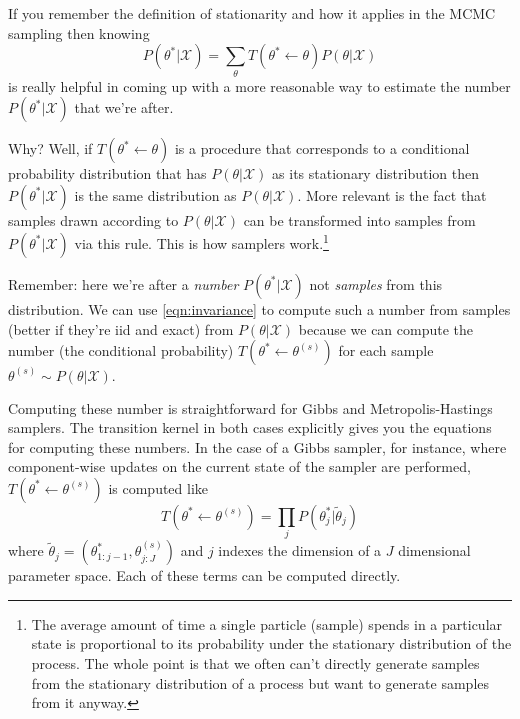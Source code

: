 \documentclass[11pt]{amsart}
\begin{document}
If you remember the definition of stationarity and how it applies in the MCMC sampling then knowing
\begin{equation}P(\theta^* | \mathcal{X}) = \sum_\theta T(\theta^* \leftarrow \theta)P(\theta|\mathcal{X})\label{eqn:invariance}\end{equation}
is really helpful in coming up with a more reasonable way to estimate the number $P(\theta^* | \mathcal{X})$ that we're after.  

Why?  Well, if $T(\theta^* \leftarrow \theta)$ is a procedure that corresponds to a conditional probability distribution that has $P(\theta | \mathcal{X})$ as its stationary distribution then $P(\theta^* | \mathcal{X})$ is the same distribution as $P(\theta|\mathcal{X})$.  More relevant is the fact that samples drawn according to $P(\theta|\mathcal{X})$ can be transformed into samples from $P(\theta^* | \mathcal{X})$ via this rule.  This is how samplers work.\footnote{The average amount of time a single particle (sample) spends in a particular state is proportional to its probability under the stationary distribution of the process.  The whole point is that we often can't directly generate samples from the stationary distribution of a process but want to generate samples from it anyway.}   

Remember: here we're after a {\em number} $P(\theta^* | \mathcal{X})$ not {\em samples} from this distribution.  We can use \eqref{eqn:invariance} to compute such a number from  samples (better if they're iid and exact) from $P(\theta|\mathcal{X})$ because we can compute the number (the conditional probability) $T(\theta^* \leftarrow \theta^{(s)})$ for each sample $ \theta^{(s)} \sim P(\theta|\mathcal{X}).$

Computing these number is straightforward for Gibbs and Metropolis-Hastings samplers.   The transition kernel in both cases explicitly gives you the equations for computing these numbers.  In the case of a Gibbs sampler, for instance, where component-wise updates on the current state of the sampler are performed, $T(\theta^* \leftarrow \theta^{(s)})$ is computed like
\[T(\theta^* \leftarrow \theta^{(s)}) = \prod_j P(\theta^*_j | \tilde{\theta}_j) \]
where $\tilde{\theta}_j = (\theta^*_{1:j-1}, \theta^{(s)}_{j:J})$ and $j$ indexes the dimension of a $J$ dimensional parameter space.  Each of these terms can be computed directly.
\end{document}
